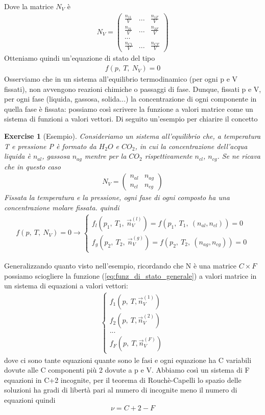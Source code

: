 \documentclass[10pt,a4paper]{article}
\newtheorem{exercise}{Exercise}
\begin{document}
Dove la matrice \(N_V\) è
\begin{align*}
	N_V = \begin{pmatrix}
		\frac{n_{11}}{V}&...&\frac{n_{1F}}{V}\\
		\frac{n_{21}}{V}&...&\frac{n_{2F}}{V}\\
		...&&\\
		\frac{n_{C1}}{V}&...&\frac{n_{CF}}{V}
	\end{pmatrix}
\end{align*}
Otteniamo quindi un'equazione di stato del tipo
\begin{align}\label{eq:funz_di_stato_generale}
	f(p,\ T,\ N_V)= 0
\end{align}
Osserviamo che in un sistema all'equilibrio termodinamico (per ogni p e V fissati), non avvengono reazioni chimiche o passaggi di fase. Dunque, fissati p e V, per ogni fase (liquida, gassosa, solida...) la concentrazione di ogni componente in quella fase è fissata: possiamo così scrivere la funzione a valori matrice come un sistema di funzioni a valori vettori. Di seguito un'esempio per chiarire il concetto
\begin{exercise}[Esempio]
	Consideriamo un sistema all'equilibrio che, a temperatura T e pressione P è formato da \(H_2O\) e \(CO_2\), in cui la concentrazione dell'acqua liquida è \(n_{al}\), gassosa \(n_{ag}\) mentre per la \(CO_2\) rispettivamente \(n_{cl}\), \(n_{cg}\). Se ne ricava che in questo caso
	\begin{align*}
		N_V = \begin{pmatrix}
			n_{al}& n_{ag}\\
			n_{cl}& n_{cg}
		\end{pmatrix}
	\end{align*}
	Fissata la temperatura e la pressione, ogni fase di ogni composto ha una concentrazione molare fissata. quindi
	\begin{align*}
		f(p,\ T,\ N_V)=0 \rightarrow
		\begin{cases}
			f_{l}(p_1,\ T_1,\ \vec{n}_V^{(l)})=f(p_1,\ T_1,\ (n_{al}, n_{cl}))=0\\
			f_{g}(p_2,\ T_2,\ \vec{n}_V^{(g)})=f(p_2,\ T_2,\ (n_{ag}, n_{cg}))=0
		\end{cases}
	\end{align*}
\end{exercise}
Generalizzando quanto visto nell'esempio, ricordando che N è una matrice \(C \times F\) possiamo sciogliere la funzione (\ref{eq:funz_di_stato_generale}) a valori matrice in un sistema di equazioni a valori vettori:
\begin{align*}
	\begin{cases}
		f_1(p,\ T, \vec{n}_V^{(1)})\\
		f_2(p,\ T, \vec{n}_V^{(2)})\\
		...\\
		f_F(p,\ T, \vec{n}_V^{(F)})
	\end{cases}
\end{align*}
dove ci sono tante equazioni quante sono le fasi e ogni equazione ha C variabili dovute alle C componenti più 2 dovute a p e V. Abbiamo così un sistema di F equazioni in C+2 incognite, per il teorema di Rouchè-Capelli lo spazio delle soluzioni ha gradi di libertà pari al numero di incognite meno il numero di equazioni quindi
\[\nu = C+2-F\]
\end{document}
